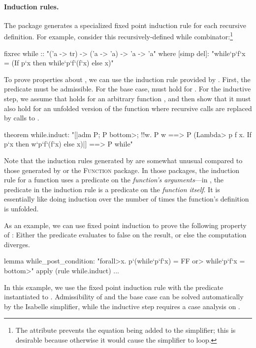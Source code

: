 \paragraph{Induction rules.} The {\fixrec} package generates a specialized fixed point induction rule for each recursive definition. For example, consider this recursively-defined while combinator:\footnote{The attribute  prevents the equation being added to the simplifier; this is desirable because otherwise it would cause the simplifier to loop.}
%
\begin{isacode}
fixrec while :: "('a -> tr) -> ('a -> 'a) -> 'a -> 'a"
  where [simp del]: "while`p`f`x = (If p`x then while`p`f`(f`x) else x)"
\end{isacode}
%
To prove properties about , we can use the induction rule  provided by {\fixrec}. First, the predicate  must be admissible. For the base case,  must hold for . For the inductive step, we assume that  holds for an arbitrary function , and then show that it must also hold for an unfolded version of the  function where recursive calls are replaced by calls to .
%
\begin{isacode}
theorem while.induct:
  "[|adm P; P \<bottom>; !!w. P w ==> P (\<Lambda> p f x. If p`x then w`p`f`(f`x) else x)|]
    ==> P while"
\end{isacode}
%
Note that the induction rules generated by {\fixrec} are somewhat unusual compared to those generated by {\recdef} or the \textsc{Function} package. In those packages, the induction rule for a function uses a predicate on the \emph{function's arguments}---in {\fixrec}, the predicate  in the induction rule is a predicate on the \emph{function itself}. It is essentially like doing induction over the number of times the function's definition is unfolded.

As an example, we can use fixed point induction to prove the following property of : Either the predicate  evaluates to false on the result, or else the computation diverges.
%
\begin{isacode}
lemma while_post_condition: "\<forall>x. p`(while`p`f`x) = FF \<or> while`p`f`x = \<bottom>"
  apply (rule while.induct) ...
\end{isacode}
%
In this example, we use the fixed point induction rule  with the predicate  instantiated to . Admissibility of  and the base case  can be solved automatically by the Isabelle simplifier, while the inductive step requires a case analysis on .

